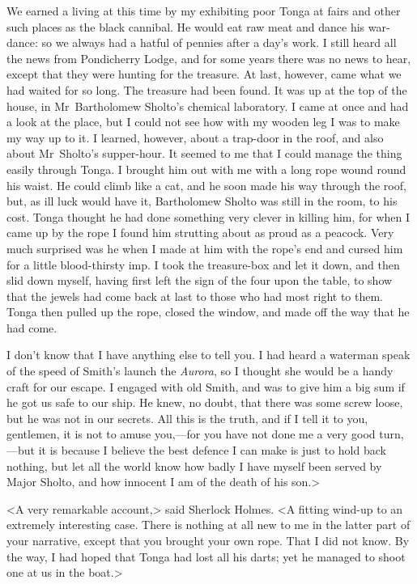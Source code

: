 We earned a living at this time by my exhibiting poor Tonga at fairs and other such places as the black cannibal. He would eat raw meat and dance his war-dance: so we always had a hatful of pennies after a day's work. I still heard all the news from Pondicherry Lodge, and for some years there was no news to hear, except that they were hunting for the treasure. At last, however, came what we had waited for so long. The treasure had been found. It was up at the top of the house, in Mr~Bartholomew Sholto's chemical laboratory. I came at once and had a look at the place, but I could not see how with my wooden leg I was to make my way up to it. I learned, however, about a trap-door in the roof, and also about Mr~Sholto's supper-hour. It seemed to me that I could manage the thing easily through Tonga. I brought him out with me with a long rope wound round his waist. He could climb like a cat, and he soon made his way through the roof, but, as ill luck would have it, Bartholomew Sholto was still in the room, to his cost. Tonga thought he had done something very clever in killing him, for when I came up by the rope I found him strutting about as proud as a peacock. Very much surprised was he when I made at him with the rope's end and cursed him for a little blood-thirsty imp. I took the treasure-box and let it down, and then slid down myself, having first left the sign of the four upon the table, to show that the jewels had come back at last to those who had most right to them. Tonga then pulled up the rope, closed the window, and made off the way that he had come.

I don't know that I have anything else to tell you. I had heard a waterman speak of the speed of Smith's launch the \textit{Aurora}, so I thought she would be a handy craft for our escape. I engaged with old Smith, and was to give him a big sum if he got us safe to our ship. He knew, no doubt, that there was some screw loose, but he was not in our secrets. All this is the truth, and if I tell it to you, gentlemen, it is not to amuse you,—for you have not done me a very good turn,—but it is because I believe the best defence I can make is just to hold back nothing, but let all the world know how badly I have myself been served by Major Sholto, and how innocent I am of the death of his son.>

<A very remarkable account,> said Sherlock Holmes. <A fitting wind-up to an extremely interesting case. There is nothing at all new to me in the latter part of your narrative, except that you brought your own rope. That I did not know. By the way, I had hoped that Tonga had lost all his darts; yet he managed to shoot one at us in the boat.>

